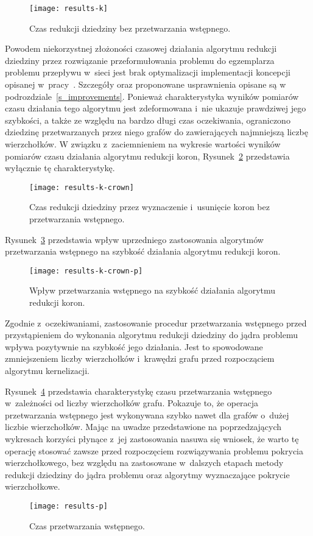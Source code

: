   \begin{figure}
    \caption{Czas redukcji dziedziny bez przetwarzania wstępnego.}
    \label{fig_results_k}
    \centering
      \texttt{[image: results-k]}
  \end{figure}

  Powodem niekorzystnej złożoności czasowej działania algorytmu redukcji dziedziny przez rozwiązanie przeformułowania problemu do egzemplarza problemu przepływu w~sieci jest brak optymalizacji implementacji koncepcji opisanej w~pracy~\cite{KernelizationAlgorithms04}.
  Szczegóły oraz proponowane usprawnienia opisane są w podrozdziale~\ref{s_improvements}.
  Ponieważ charakterystyka wyników pomiarów czasu działania tego algorytmu jest zdeformowana i~nie ukazuje prawdziwej jego szybkości, a także ze względu na bardzo długi czas oczekiwania, ograniczono dziedzinę przetwarzanych przez niego grafów do zawierających najmniejszą liczbę wierzchołków.
  W związku z~zaciemnieniem na wykresie wartości wyników pomiarów czasu działania algorytmu redukcji koron, Rysunek~\ref{fig_results_k_crown} przedstawia wyłącznie tę charakterystykę.

  \begin{figure}
    \caption{Czas redukcji dziedziny przez wyznaczenie i~usunięcie koron bez przetwarzania wstępnego.}
    \label{fig_results_k_crown}
    \centering
      \texttt{[image: results-k-crown]}
  \end{figure}

  Rysunek~\ref{fig_results_k_crown_p} przedstawia wpływ uprzedniego zastosowania algorytmów przetwarzania wstępnego na szybkość działania algorytmu redukcji koron.
  \begin{figure}
    \caption{Wpływ przetwarzania wstępnego na szybkość działania algorytmu redukcji koron.}
    \label{fig_results_k_crown_p}
    \centering
      \texttt{[image: results-k-crown-p]}
  \end{figure}

  Zgodnie z~oczekiwaniami, zastosowanie procedur przetwarzania wstępnego przed przystąpieniem do wykonania algorytmu redukcji dziedziny do jądra problemu wpływa pozytywnie na szybkość jego działania.
  Jest to spowodowane zmniejszeniem liczby wierzchołków i~krawędzi grafu przed rozpocząciem algorytmu kernelizacji.

  Rysunek~\ref{fig_results_p} przedstawia charakterystykę czasu przetwarzania wstępnego w~zależności od liczby wierzchołków grafu.
  Pokazuje to, że operacja przetwarzania wstępnego jest wykonywana szybko nawet dla grafów o~dużej liczbie wierzchołków. Mając na uwadze przedstawione na poprzedzających wykresach korzyści płynące z~jej zastosowania nasuwa się wniosek, że warto tę operację stosować zawsze przed rozpoczęciem rozwiązywania problemu pokrycia wierzchołkowego, bez względu na zastosowane w~dalszych etapach metody redukcji dziedziny do jądra problemu oraz algorytmy wyznaczające pokrycie wierzchołkowe.
  \begin{figure}
    \caption{Czas przetwarzania wstępnego.}
    \label{fig_results_p}
    \centering
      \texttt{[image: results-p]}
  \end{figure}

  